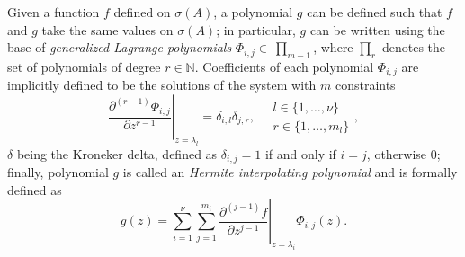 Given a function $f$ defined on $\sigma(A)$, a polynomial $g$ can be defined
such that $f$ and $g$ take the same values on $\sigma(A)$; in particular, $g$
can be written using the base of \textit{generalized Lagrange polynomials}
$\Phi_{i,j}\in~\prod_{m-1}$, where $\prod_{r}$ denotes the set of polynomials of
degree $r\in\mathbb{N}$. Coefficients of each polynomial $\Phi_{i,j}$ are implicitly
defined to be the solutions of the system with $m$ constraints
\begin{equation}
    \label{eq:Phi-polys-defining-constraints}
    \left. \frac{\partial^{(r-1)}{\Phi_{i,j}}}{\partial{z}^{r-1}} \right|_{z=\lambda_{l}} = \delta_{i,l}\delta_{j,r},
    \quad 
    \begin{array}{l} 
        l\in \lbrace 1, \ldots, \nu \rbrace \\
        r \in \lbrace 1, \ldots, m_{l} \rbrace
    \end{array},
\end{equation}
$\delta$ being the Kroneker delta, defined as $\delta_{i,j}=1$ if and only if
$i=j$, otherwise $0$; finally, polynomial $g$ is called an \emph{Hermite
interpolating polynomial} and is formally defined as
\begin{equation}
\label{eq:Hermite-interpolating-polynomial}
g(z) = \sum_{i=1}^{\nu}{\sum_{j=1}^{m_{i}}{ \left.
\frac{\partial^{(j-1)}{f}}{\partial{z}^{j-1}} \right|_{z=\lambda_{i}}\Phi_{i,j}(z) }}.
\end{equation}

